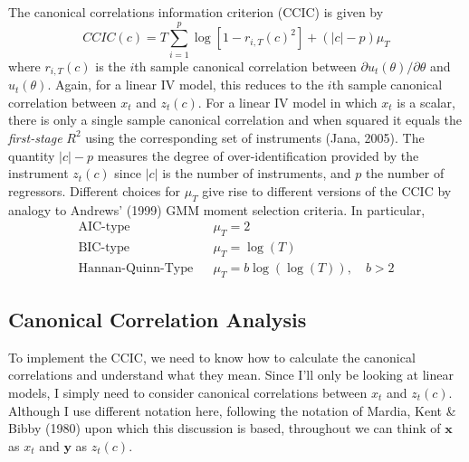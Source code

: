 \documentclass[12pt]{article}
\theoremstyle{definition}
\begin{document}
The canonical correlations information criterion (CCIC) is given by
  $$CCIC(c) = T\sum_{i=1}^p \log\left[1 - r_{i,T}(c)^2 \right] + (|c| - p)\mu_T$$
where $r_{i,T}(c)$ is the $i$th sample canonical correlation between $\partial u_t(\theta)/\partial \theta$ and $u_t(\theta)$. Again, for a linear IV model, this reduces to the $i$th sample canonical correlation between $x_t$ and $z_t(c)$. For a linear IV model in which $x_t$ is a scalar, there is only a single sample canonical correlation and when squared it equals the \emph{first-stage} $R^2$ using the corresponding set of instruments (Jana, 2005). The quantity $|c| - p$ measures the degree of over-identification provided by the instrument $z_t(c)$ since $|c|$ is the number of instruments, and $p$ the number of regressors. Different choices for $\mu_T$ give rise to different versions of the CCIC by analogy to Andrews' (1999) GMM moment selection criteria. In particular, 
  \begin{eqnarray*}
    \mbox{AIC-type} && \mu_T = 2\\
    \mbox{BIC-type} && \mu_T = \log(T)\\
    \mbox{Hannan-Quinn-Type} && \mu_T = b \log(\log(T)), \quad b > 2
  \end{eqnarray*}


\subsection{Canonical Correlation Analysis} 
To implement the CCIC, we need to know how to calculate the canonical correlations and understand what they mean. Since I'll only be looking at linear models, I simply need to consider canonical correlations between $x_t$ and $z_t(c)$. Although I use different notation here, following the notation of Mardia, Kent \& Bibby (1980) upon which this discussion is based, throughout we can think of $\mathbf{x}$ as $x_t$ and $\mathbf{y}$ as $z_t(c)$.
\end{document}
